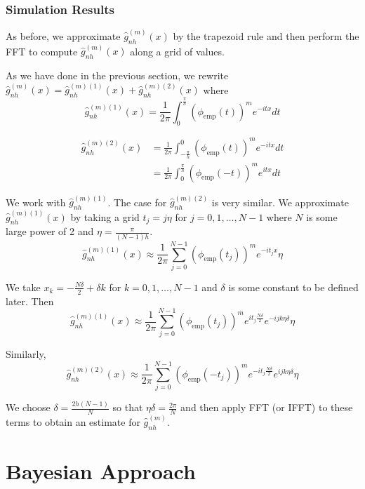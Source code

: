 \documentclass[a4paper,11pt]{article}
\theoremstyle{theorem}
\theoremstyle{definition}
\theoremstyle{remark}
\begin{document}
\subsubsection{Simulation Results}

As before, we approximate $\hat{g}_{nh}^{(m)}(x)$ by the trapezoid rule and then perform the FFT to compute $\hat{g}_{nh}^{(m)}(x)$ along a grid of values.

As we have done in the previous section, we rewrite $\hat{g}_{nh}^{(m)}(x) = \hat{g}_{nh}^{(m)(1)}(x) + \hat{g}_{nh}^{(m)(2)}(x)$ where
\begin{equation}
\hat{g}_{nh}^{(m)(1)}(x) = \frac{1}{2\pi}\int_{0}^{\frac{\pi}{h}}{\left(\phi_{\text{emp}}(t)\right)^{m} e^{-itx} dt}
\end{equation}

\begin{align*}
\hat{g}_{nh}^{(m)(2)}(x) &= \frac{1}{2\pi}\int_{-\frac{\pi}{h}}^{0}{\left(\phi_{\text{emp}}(t)\right)^{m} e^{-itx} dt} \\
&= \frac{1}{2\pi}\int_{0}^{\frac{\pi}{h}}{\left(\phi_{\text{emp}}(-t)\right)^{m} e^{itx} dt}
\end{align*}

We work with $\hat{g}_{nh}^{(m)(1)}$. The case for $\hat{g}_{nh}^{(m)(2)}$ is very similar. We approximate $\hat{g}_{nh}^{(m)(1)}(x)$ by taking a grid $t_j = j\eta$ for $j = 0,1,\dotsc, N-1$ where $N$ is some large power of 2 and $\eta = \frac{\pi}{(N-1)h}$.
\begin{equation}
\hat{g}_{nh}^{(m)(1)}(x) \approx \frac{1}{2\pi}\sum_{j=0}^{N-1}{\left(\phi_{\text{emp}}(t_j)\right)^m e^{-it_j x} \eta}
\end{equation}

We take $x_k = -\frac{N\delta}{2} + \delta k$ for $k = 0, 1, \dotsc, N-1$ and $\delta$ is some constant to be defined later. Then
\[
\hat{g}_{nh}^{(m)(1)}(x) \approx \frac{1}{2\pi}\sum_{j=0}^{N-1}{\left(\phi_{\text{emp}}(t_j)\right)^m e^{it_j \frac{N\delta}{2}} e^{-ijk\eta\delta} \eta}
\]

Similarly,
\[
\hat{g}_{nh}^{(m)(2)}(x) \approx \frac{1}{2\pi}\sum_{j=0}^{N-1}{\left(\phi_{\text{emp}}(-t_j)\right)^m e^{-it_j \frac{N\delta}{2}} e^{ijk\eta\delta} \eta}
\]

We choose $\delta = \frac{2h(N-1)}{N}$ so that $\eta\delta = \frac{2\pi}{N}$ and then apply FFT (or IFFT) to these terms to obtain an estimate for $\hat{g}_{nh}^{(m)}$.

\section{Bayesian Approach}
\end{document}
